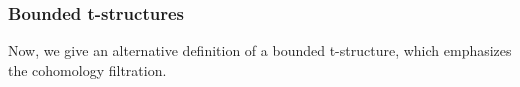 \documentclass[12pt]{article}
\begin{document}



\subsubsection{Bounded t-structures}

Now, we give an alternative definition of a bounded t-structure, which emphasizes the cohomology filtration.
\end{document}
